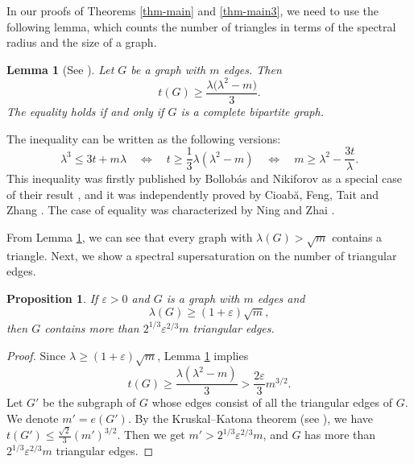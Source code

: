\documentclass[11pt]{article}
\newtheorem{lemma}[theorem]{Lemma}
\newtheorem{proposition}[theorem]{Proposition}
\begin{document}
In our proofs of Theorems \ref{thm-main} 
and \ref{thm-main3}, 
we need to use the following lemma, 
which counts the number of triangles in terms of the 
spectral radius and the size of a graph. 

\begin{lemma}[See \cite{BN2007jctb,CFTZ20,NZ2021}] 
\label{thm-BN-CFTZ-NZ}
Let $G$ be a graph with $m$ edges. Then 
\begin{equation*} \label{eq-spectral-super-triangle}
t(G) \ge \frac{\lambda \bigl(\lambda^2 - m\bigr)}{3}. 
  \end{equation*}
  The equality holds if and only if $G$ is a complete bipartite graph. 
\end{lemma}



The inequality can be written as the following versions: 
\begin{equation*} 
   \lambda^3 \le 3t + m \lambda 
\quad \Leftrightarrow \quad {t\ge \frac{1}{3}\lambda (\lambda^2 - m)  } 
\quad \Leftrightarrow \quad m \ge \lambda^2- \frac{3t}{\lambda}. 
\end{equation*}
This inequality was firstly published by 
Bollob\'{a}s and Nikiforov  as a special case 
of their result \cite[Theorem 1]{BN2007jctb}, 
and it was independently proved by Cioab\u{a},  Feng, 
Tait and Zhang \cite{CFTZ20}.  
The case of equality was characterized by Ning and Zhai \cite{NZ2021}. 

  
\medskip 
From Lemma \ref{thm-BN-CFTZ-NZ}, we can see that 
every graph with  $\lambda (G) > \sqrt{m}$ contains a triangle. 
Next, we show a spectral supersaturation 
on the number of triangular edges.  

\begin{proposition} \label{thm-m}
If  $\varepsilon >0$ and $G$ is a graph with $m$ edges and 
\[ \lambda (G) \ge (1+ \varepsilon ) \sqrt{m}, \]    
then $G$ contains more than $2^{1/3}\varepsilon^{2/3}m$ triangular edges. 
\end{proposition}

\begin{proof} 
Since $\lambda \ge (1+ \varepsilon ) \sqrt{m}$, 
Lemma \ref{thm-BN-CFTZ-NZ}
 implies 
 \[  t(G) \ge \frac{\lambda (\lambda^2-m)}{3} >  
  \frac{2\varepsilon }{3} m^{3/2}. \]  
  Let $G'$ be the subgraph of $G$ whose edges consist of all the triangular edges of $G$.  We denote $m'=e(G')$.   
By the Kruskal--Katona theorem (see \cite[page 305]{Bollobas78}), we have   
$ t(G') \le \frac{\sqrt{2}}{3} (m')^{3/2}$. Then we get $m' > 2^{1/3}\varepsilon^{2/3}m$, and 
$G$ has more than $2^{1/3}\varepsilon^{2/3}m$ 
triangular edges. 
\end{proof}
\end{document}
